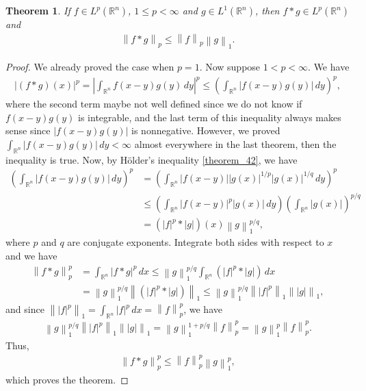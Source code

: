 \documentclass[11pt]{book}
\newtheorem{theorem}{Theorem}[chapter]
\theoremstyle{definition}
\numberwithin{equation}{chapter}
\begin{document}
\begin{theorem}
If $f\in L^p(\mathbb{R}^n)$, $1 \leq p < \infty$ and $g \in L^1(\mathbb{R}^n)$, then $f*g \in L^p(\mathbb{R}^n)$ and
\begin{align*}
    \left\|f*g\right\|_p \leq \left\|f\right\|_p \left\|g\right\|_1.
\end{align*}
\end{theorem}
\begin{proof}
We already proved the case when $p = 1$. Now suppose $1 < p < \infty$. We have
\begin{align*}
    \left|(f*g)(x)\right|^p = \left|\int_{\mathbb{R}^n} f(x-y)g(y) \,dy\right|^p \leq \left(\int_{\mathbb{R}^n} \left|f(x-y)g(y) \right|\,dy\right)^p,
\end{align*}
where the second term maybe not well defined since we do not know if $f(x-y)g(y)$ is integrable, and the last term of this inequality always makes sense since $\left|f(x-y)g(y) \right|$ is nonnegative. However, we proved $\int_{\mathbb{R}^n} \left|f(x-y)g(y) \right|\,dy < \infty$ almost everywhere in the last theorem, then the inequality is true. Now, by Hölder's inequality \ref{theorem_42}, we have
\begin{align*}
    \left(\int_{\mathbb{R}^n} \left|f(x-y)g(y) \right|\,dy\right)^p & = \left(\int_{\mathbb{R}^n} \left|f(x-y)\right| \left|g(x)\right|^{1/p} \left|g(x)\right|^{1/q} \,dy\right)^p \\
    & \leq \left(\int_{\mathbb{R}^n} \left|f(x-y)\right|^p \left|g(x)\right| \,dy\right) \left(\int_{\mathbb{R}^n} \left|g(x)\right|\right)^{p/q} \\
    & = (\left|f\right|^p * \left|g\right|)(x) \left\|g\right\|_1^{p/q},
\end{align*}
where $p$ and $q$ are conjugate exponents. Integrate both sides with respect to $x$ and we have
\begin{align*}
    \left\|f*g\right\|_p^p & = \int_{\mathbb{R}^n} \left|f*g\right|^p\,dx \leq \left\|g\right\|_1^{p/q} \int_{\mathbb{R}^n} (\left|f\right|^p * \left|g\right|)\,dx \\
    & = \left\|g\right\|_1^{p/q} \left\| (\left|f\right|^p * \left|g\right|) \right\|_1 \leq \left\|g\right\|_1^{p/q} \left\| \left|f\right|^p \right\|_1 \left\| \left|g\right| \right\|_1,
\end{align*}
and since $\left\| \left|f\right|^p \right\|_1 = \int_{\mathbb{R}^n} \left|f\right|^p\,dx = \left\|f \right\|_p^p$, we have
\begin{align*}
    \left\|g\right\|_1^{p/q} \left\| \left|f\right|^p \right\|_1 \left\| \left|g\right| \right\|_1 = \left\|g\right\|_1^{1+p/q} \left\|f \right\|_p^p = \left\|g\right\|_1^{p} \left\|f \right\|_p^p.
\end{align*}
Thus, 
\begin{align*}
    \left\|f*g\right\|_p^p \leq \left\|f \right\|_p^p \left\|g\right\|_1^{p},
\end{align*}
which proves the theorem.
\end{proof}
\end{document}
